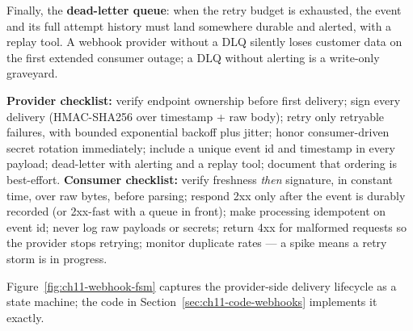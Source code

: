 Finally, the \textbf{dead-letter queue}: when the retry budget is exhausted,
the event and its full attempt history must land somewhere durable and
alerted, with a replay tool. A webhook provider without a DLQ silently loses
customer data on the first extended consumer outage; a DLQ without alerting
is a write-only graveyard.

\begin{keyconceptbox}
\textbf{Provider checklist:} verify endpoint ownership before first delivery;
sign every delivery (HMAC-SHA256 over timestamp + raw body); retry only
retryable failures, with bounded exponential backoff plus jitter; honor
consumer-driven secret rotation immediately; include a unique event id and
timestamp in every payload; dead-letter with alerting and a replay tool;
document that ordering is best-effort.
\textbf{Consumer checklist:} verify freshness \emph{then} signature, in
constant time, over raw bytes, before parsing; respond 2xx only after the
event is durably recorded (or 2xx-fast with a queue in front); make
processing idempotent on event id; never log raw payloads or secrets;
return 4xx for malformed requests so the provider stops retrying; monitor
duplicate rates --- a spike means a retry storm is in progress.
\end{keyconceptbox}

Figure~\ref{fig:ch11-webhook-fsm} captures the provider-side delivery
lifecycle as a state machine; the code in
Section~\ref{sec:ch11-code-webhooks} implements it exactly.

